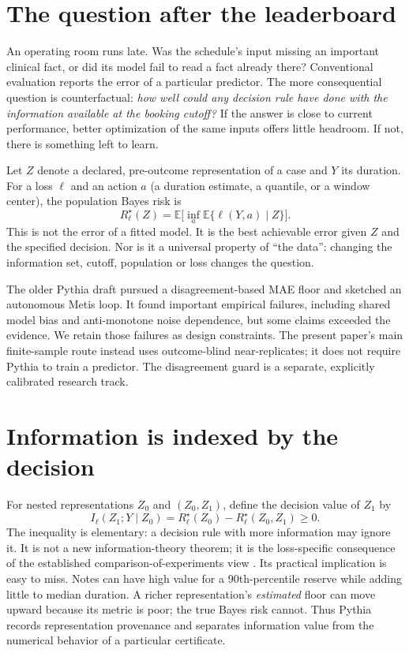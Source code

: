 \documentclass[11pt,a4paper]{article}
\newcommand{\risk}{R^{\star}}
\begin{document}
\section{The question after the leaderboard}

An operating room runs late. Was the schedule's input missing an important clinical fact, or did its model fail to read a fact already there? Conventional evaluation reports the error of a particular predictor. The more consequential question is counterfactual: \emph{how well could any decision rule have done with the information available at the booking cutoff?} If the answer is close to current performance, better optimization of the same inputs offers little headroom. If not, there is something left to learn.

Let $Z$ denote a declared, pre-outcome representation of a case and $Y$ its duration. For a loss $\ell$ and an action $a$ (a duration estimate, a quantile, or a window center), the population Bayes risk is
\begin{equation}
\risk_\ell(Z)=\mathbb E\big[\inf_a\mathbb E\{\ell(Y,a)\mid Z\}\big].\label{eq:bayes}
\end{equation}
This is not the error of a fitted model. It is the best achievable error given $Z$ and the specified decision. Nor is it a universal property of ``the data'': changing the information set, cutoff, population or loss changes the question.

The older Pythia draft \cite{perasv2} pursued a disagreement-based MAE floor and sketched an autonomous Metis loop. It found important empirical failures, including shared model bias and anti-monotone noise dependence, but some claims exceeded the evidence. We retain those failures as design constraints. The present paper's main finite-sample route instead uses outcome-blind near-replicates; it does not require Pythia to train a predictor. The disagreement guard is a separate, explicitly calibrated research track.

\section{Information is indexed by the decision}

For nested representations $Z_0$ and $(Z_0,Z_1)$, define the decision value of $Z_1$ by
\begin{equation}
I_\ell(Z_1;Y\mid Z_0)=\risk_\ell(Z_0)-\risk_\ell(Z_0,Z_1)\geq 0.\label{eq:info}
\end{equation}
The inequality is elementary: a decision rule with more information may ignore it. It is not a new information-theory theorem; it is the loss-specific consequence of the established comparison-of-experiments view \cite{blackwell}. Its practical implication is easy to miss. Notes can have high value for a 90th-percentile reserve while adding little to median duration. A richer representation's \emph{estimated} floor can move upward because its metric is poor; the true Bayes risk cannot. Thus Pythia records representation provenance and separates information value from the numerical behavior of a particular certificate.
\end{document}
